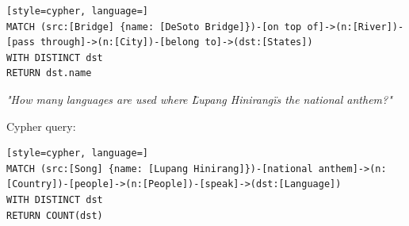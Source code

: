 \begin{lstlisting}[style=cypher, language=]
MATCH (src:[Bridge] {name: [DeSoto Bridge]})-[on top of]->(n:[River])-[pass through]->(n:[City])-[belong to]->(dst:[States])
WITH DISTINCT dst
RETURN dst.name
\end{lstlisting}

 \textit{"How many languages are used where \"Lupang Hinirang\" is the national anthem?"}

Cypher query:

\begin{lstlisting}[style=cypher, language=]
MATCH (src:[Song] {name: [Lupang Hinirang]})-[national anthem]->(n:[Country])-[people]->(n:[People])-[speak]->(dst:[Language])
WITH DISTINCT dst
RETURN COUNT(dst)
\end{lstlisting}
